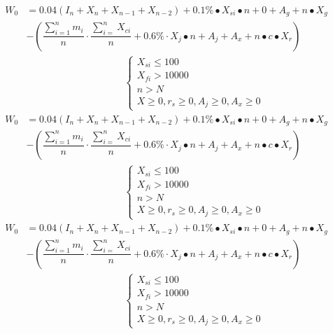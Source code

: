 \documentclass[../mcmpaper]{subfiles}
\begin{document}
\begin{equation}
\begin{aligned}
W_{0}&=0.04\left(I_{n}+X_{n}+X_{n-1}+X_{n-2}\right)+0.1 \% \bullet X_{s i} \bullet n+0+A_{g}+n \bullet X_{g} \\
&-\left(\dfrac{\sum_{i=1}^{n} m_{i}}{n} \cdot \dfrac{\sum_{i=}^{n} X_{c i}}{n}+0.6\% \cdot X_{j} \bullet n+A_{j}+A_{x}+n \bullet c \bullet X_{r}\right) \\
&\hspace{10em}\left\{\begin{array}{l}
X_{s i} \leq 100 \\
X_{f i}>10000 \\
n>N \\
X \geq 0, r_{s} \geq 0, A_{j} \geq 0, A_{x} \geq 0
\end{array}\right.
\end{aligned}
\end{equation}
\begin{equation}
\begin{aligned}
W_{0}&=0.04\left(I_{n}+X_{n}+X_{n-1}+X_{n-2}\right)+0.1 \% \bullet X_{s i} \bullet n+0+A_{g}+n \bullet X_{g} \\
&-\left(\dfrac{\sum_{i=1}^{n} m_{i}}{n} \cdot \dfrac{\sum_{i=}^{n} X_{c i}}{n}+0.6\% \cdot X_{j} \bullet n+A_{j}+A_{x}+n \bullet c \bullet X_{r}\right) \\
&\hspace{10em}\left\{\begin{array}{l}
X_{s i} \leq 100 \\
X_{f i}>10000 \\
n>N \\
X \geq 0, r_{s} \geq 0, A_{j} \geq 0, A_{x} \geq 0
\end{array}\right.
\end{aligned}
\end{equation}
\begin{equation}
\begin{aligned}
W_{0}&=0.04\left(I_{n}+X_{n}+X_{n-1}+X_{n-2}\right)+0.1 \% \bullet X_{s i} \bullet n+0+A_{g}+n \bullet X_{g} \\
&-\left(\dfrac{\sum_{i=1}^{n} m_{i}}{n} \cdot \dfrac{\sum_{i=}^{n} X_{c i}}{n}+0.6\% \cdot X_{j} \bullet n+A_{j}+A_{x}+n \bullet c \bullet X_{r}\right) \\
&\hspace{10em}\left\{\begin{array}{l}
X_{s i} \leq 100 \\
X_{f i}>10000 \\
n>N \\
X \geq 0, r_{s} \geq 0, A_{j} \geq 0, A_{x} \geq 0
\end{array}\right.
\end{aligned}
\end{equation}
\end{document}
